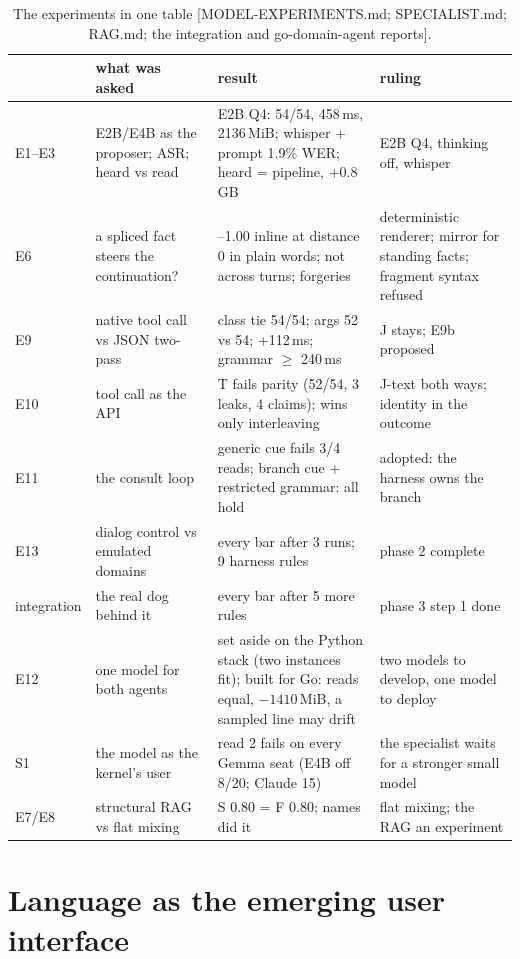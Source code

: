 \documentclass[11pt]{article}
\newcommand{\src}[1]{{\footnotesize\textsf{[#1]}}}
\begin{document}
\begin{table}[t]
\centering\small
\begin{tabular}{@{}>{\raggedright\arraybackslash}p{1.3cm}>{\raggedright\arraybackslash}p{4.4cm}>{\raggedright\arraybackslash}p{4.9cm}>{\raggedright\arraybackslash}p{3.7cm}@{}}
\toprule
 & what was asked & result & ruling \\
\midrule
E1--E3 & E2B/E4B as the proposer; ASR; heard vs read & E2B Q4: 54/54, 458\,ms, 2136\,MiB; whisper + prompt 1.9\% WER; heard = pipeline, +0.8\,GB & E2B Q4, thinking off, whisper \\
E6 & a spliced fact steers the continuation? & 0.92--1.00 inline at distance 0 in plain words; not across turns; forgeries & deterministic renderer; mirror for standing facts; fragment syntax refused \\
E9 & native tool call vs JSON two-pass & class tie 54/54; args 52 vs 54; +112\,ms; grammar $\ge$ 240\,ms & J stays; E9b proposed \\
E10 & tool call as the API & T fails parity (52/54, 3 leaks, 4 claims); wins only interleaving & J-text both ways; identity in the outcome \\
E11 & the consult loop & generic cue fails 3/4 reads; branch cue + restricted grammar: all hold & adopted: the harness owns the branch \\
E13 & dialog control vs emulated domains & every bar after 3 runs; 9 harness rules & phase 2 complete \\
integration & the real dog behind it & every bar after 5 more rules & phase 3 step 1 done \\
E12 & one model for both agents & set aside on the Python stack (two instances fit); built for Go: reads equal, $-1410$\,MiB, a sampled line may drift & two models to develop, one model to deploy \\
S1 & the model as the kernel's user & read 2 fails on every Gemma seat (E4B off 8/20; Claude 15) & the specialist waits for a stronger small model \\
E7/E8 & structural RAG vs flat mixing & S 0.80 = F 0.80; names did it & flat mixing; the RAG an experiment \\
\bottomrule
\end{tabular}
\caption{The experiments in one table \src{MODEL-EXPERIMENTS.md; SPECIALIST.md; RAG.md;
the integration and go-domain-agent reports}.}
\label{tab:outcomes}
\end{table}

\section{Language as the emerging user interface}\label{sec:language}
\end{document}

